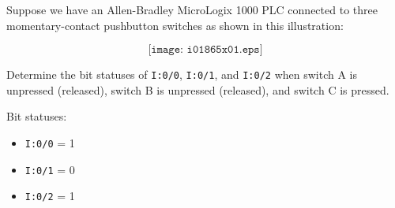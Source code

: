 

Suppose we have an Allen-Bradley MicroLogix 1000 PLC connected to three momentary-contact pushbutton switches as shown in this illustration:

$$\texttt{[image: i01865x01.eps]}$$

Determine the bit statuses of {\tt I:0/0}, {\tt I:0/1}, and {\tt I:0/2} when switch A is unpressed (released), switch B is unpressed (released), and switch C is pressed.







Bit statuses:

\begin{itemize}
\item{} {\tt I:0/0} = 1
\item{} {\tt I:0/1} = 0
\item{} {\tt I:0/2} = 1
\end{itemize}











